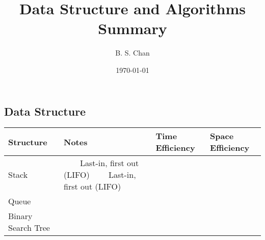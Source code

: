 \documentclass[a4paper,11pt]{article}
\makeatletter
\newcommand{\tabitem}{~~\llap{\textbullet}~~}
\newcommand{\linia}{\rule{\linewidth}{0.5pt}}
\theoremstyle{mytheor}
\renewcommand{\maketitle}{
\begin{center}
\vspace{2ex}
{\huge \textsc{\@title}}
\vspace{1ex}
\\
\linia\\
\@author \hfill \@date
\vspace{4ex}
\end{center}
}
\makeatother
\begin{document}
\title{Data Structure and Algorithms Summary}

\author{B. S. Chan}

\date{\today}

\newcommand{\stacknotes}{
  \tabitem Last-in, first out (LIFO)\newline
  \tabitem Last-in, first out (LIFO)
}
\begin{landscape}
\section*{Data Structure}
\begin{longtable}{|l|l|l|l}
\hline
Structure&Notes&Time Efficiency& Space Efficiency\\\hline
Stack & \stacknotes  &&\\\hline
Queue & \tabitem &&\\\hline
Binary Search Tree & \tabitem &&\\\hline
\hline
\end{longtable}


\end{landscape}
\end{document}
